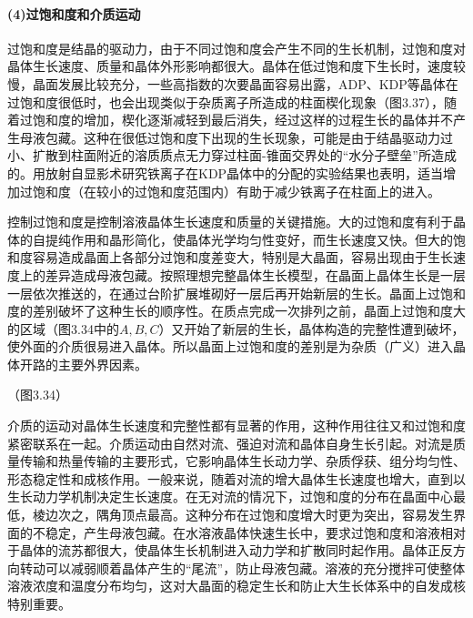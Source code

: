 \paragraph{(4)过饱和度和介质运动}过饱和度是结晶的驱动力，由于不同过饱和度会产生不同的生长机制，过饱和度对晶体生长速度、质量和晶体外形影响都很大。晶体在低过饱和度下生长时，速度较慢，晶面发展比较充分，一些高指数的次要晶面容易出露，ADP、KDP等晶体在过饱和度很低时，也会出现类似于杂质离子所造成的柱面楔化现象（图3.37），随着过饱和度的增加，楔化逐渐减轻到最后消失，经过这样的过程生长的晶体并不产生母液包藏。这种在很低过饱和度下出现的生长现象，可能是由于结晶驱动力过小、扩散到柱面附近的溶质质点无力穿过柱面-锥面交界处的“水分子壁垒”所造成的。用放射自显影术研究铁离子在KDP晶体中的分配的实验结果也表明，适当增加过饱和度（在较小的过饱和度范围内）有助于减少铁离子在柱面上的进入。

控制过饱和度是控制溶液晶体生长速度和质量的关键措施。大的过饱和度有利于晶体的自提纯作用和晶形简化，使晶体光学均匀性变好，而生长速度又快。但大的饱和度容易造成晶面上各部分过饱和度差变大，特别是大晶面，容易出现由于生长速度上的差异造成母液包藏。按照理想完整晶体生长模型，在晶面上晶体生长是一层一层依次推送的，在通过台阶扩展堆砌好一层后再开始新层的生长。晶面上过饱和度的差别破坏了这种生长的顺序性。在质点完成一次排列之前，晶面上过饱和度大的区域（图3.34中的$A, B, C$）又开始了新层的生长，晶体构造的完整性遭到破坏，使外面的介质很易进入晶体。所以晶面上过饱和度的差别是为杂质（广义）进入晶体开路的主要外界因素。

（图3.34）

介质的运动对晶体生长速度和完整性都有显著的作用，这种作用往往又和过饱和度紧密联系在一起。介质运动由自然对流、强迫对流和晶体自身生长引起。对流是质量传输和热量传输的主要形式，它影响晶体生长动力学、杂质俘获、组分均匀性、形态稳定性和成核作用。一般来说，随着对流的增大晶体生长速度也增大，直到以生长动力学机制决定生长速度。在无对流的情况下，过饱和度的分布在晶面中心最低，棱边次之，隅角顶点最高。这种分布在过饱和度增大时更为突出，容易发生界面的不稳定，产生母液包藏。在水溶液晶体快速生长中，要求过饱和度和溶液相对于晶体的流苏都很大，使晶体生长机制进入动力学和扩散同时起作用。晶体正反方向转动可以减弱顺着晶体产生的“尾流”，防止母液包藏。溶液的充分搅拌可使整体溶液浓度和温度分布均匀，这对大晶面的稳定生长和防止大生长体系中的自发成核特别重要。
